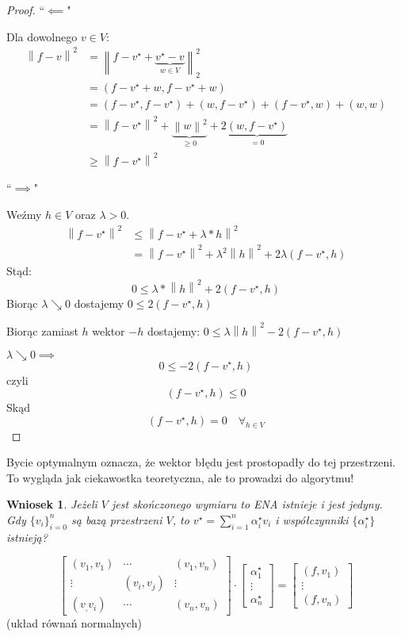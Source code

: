 \documentclass[hidelinks,a4paper,fleqn,oneside]{book}
\newcommand{\norm}[1]{\left\lVert#1\right\rVert}
\newtheorem{wniosek}{Wniosek}
\begin{document}
\begin{proof}
``$\impliedby$"

Dla dowolnego $v \in V$:
\[
	\begin{array}{rl}
	\norm{f-v}^2 & = \norm{f - v^\star + \underbrace{v^\star - v}_{w \in V}}_2^2 \\
	& = (f-v^\star + w, f-v^\star + w) \\
	& = (f-v^\star, f-v^\star) + (w, f-v^\star) + (f-v^\star, w) + (w, w) \\
	& = \norm{f-v^\star}^2 + \underbrace{\norm{w}^2}_{\geq 0} + 2\underbrace{(w, f-v^\star)}_{=0} \\
	& \geq \norm{f-v^\star}^2
	\end{array}
\]

``$\implies$"

Weźmy $h \in V$ oraz $\lambda > 0$.
\[
	\begin{array}{rl}
	\norm{f-v^\star}^2 & \leq \norm{f-v^\star + \lambda*h}^2 \\
		& = \norm{f-v^\star}^2 + \lambda^2\norm{h}^2 + 2\lambda(f-v^\star, h)
	\end{array}
\]
Stąd:
\[
	0 \leq \lambda * \norm{h}^2 + 2(f-v^\star, h)
\]
Biorąc $\lambda \searrow 0$ dostajemy $0 \leq 2(f-v^\star, h)$

Biorąc zamiast $h$ wektor $-h$ dostajemy: $0 \leq \lambda \norm{h}^2 - 2(f - v^\star, h)$

$\lambda \searrow 0 \implies$
\[
	0 \leq -2(f-v^\star, h)
\] 
czyli
\[
 	(f - v^\star, h) \leq 0
\]
Skąd
\[
	(f-v^\star, h) = 0 \quad \forall_{h \in V}
\]

\end{proof}

Bycie optymalnym oznacza, że wektor błędu jest prostopadły do tej przestrzeni. To wygląda jak ciekawostka teoretyczna, ale to prowadzi do algorytmu!

\begin{wniosek}
	Jeżeli $V$ jest skończonego wymiaru to ENA istnieje i jest jedyny. Gdy $\{v_i\}^n_{i=0}$ są bazą przestrzeni $V$, to $v^\star = \sum_{i=1}^n \alpha_i^\star v_i$ i współczynniki $\{\alpha_i^\star\}$ istnieją?
\end{wniosek}

\[
	\left[
		\begin{array}{ccc}
		(v_1,v_1) & \cdots & (v_1, v_n) \\
		\vdots & (v_i, v_j) & \vdots \\
		(v_, v_i) & \cdots & (v_n, v_n)
		\end{array}
	\right]
	\cdot
	\left[
		\begin{array}{c}
		\alpha_1^\star \\ \vdots \\ \alpha_n^\star
		\end{array}
	\right]
	=
	\left[
		\begin{array}{c}
		(f, v_1) \\
		\vdots \\
		(f, v_n)
		\end{array}
	\right]
\]
(układ równań normalnych)
\end{document}
